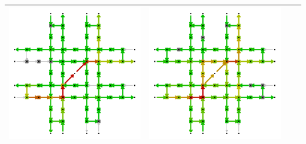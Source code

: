 \begin{table}[b]
\begin{tabularx}{\textwidth}{|Y|Y|Y|Y|}
		\includegraphics[trim=0 0 0 -4,scale=0.155]{../gfx/data/E3_003.png} &
		\includegraphics[trim=0 0 0 -4,scale=0.155]{../gfx/data/E4_003.png} \\ \hline
		

\end{tabularx}
\end{table}
